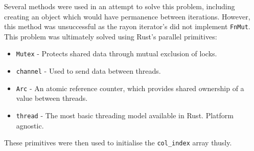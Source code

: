 Several methods were used in an attempt to solve this problem, including creating an object which would have permanence between iterations. However, this method was unsuccessful as the rayon iterator's did not implement \texttt{FnMut}. This problem was ultimately solved using Rust's parallel primitives:

\begin{itemize}
    \item \texttt{Mutex} - Protects shared data through mutual exclusion of locks.
    \item \texttt{channel} - Used to send data between threads.
    \item \texttt{Arc} - An atomic reference counter, which provides shared ownership of a value between threads.
    \item \texttt{thread} - The most basic threading model available in Rust. Platform agnostic.
\end{itemize}

These primitives were then used to initialise the \texttt{col\_index} array thusly.

